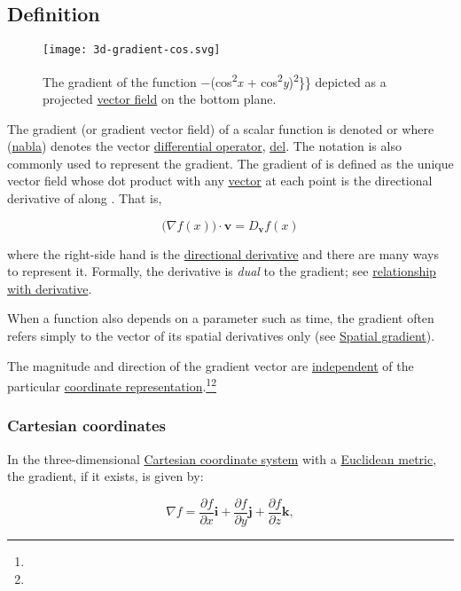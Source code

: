 \documentclass[
]{article}
\begin{document}
\hypertarget{definition}{%
\subsection{Definition}\label{definition}}

\begin{figure}
\centering
\texttt{[image: 3d-gradient-cos.svg]}
\caption{The gradient of the function −(cos\textsuperscript{2}\emph{x} +
cos\textsuperscript{2}\emph{y})\textsuperscript{2}\}\} depicted as a
projected \href{vector_field}{vector field} on the bottom plane.}
\end{figure}

The gradient (or gradient vector field) of a scalar function is denoted
or where (\href{nabla_symbol}{nabla}) denotes the vector
\href{differential_operator}{differential operator}, \url{del}. The
notation is also commonly used to represent the gradient. The gradient
of is defined as the unique vector field whose dot product with any
\href{Euclidean_vector}{vector} at each point is the directional
derivative of along . That is,

\[\big(\nabla f(x)\big)\cdot \mathbf{v} = D_{\mathbf v}f(x)\]

where the right-side hand is the
\href{directional_derivative}{directional derivative} and there are many
ways to represent it. Formally, the derivative is \emph{dual} to the
gradient; see \protect\hyperlink{Derivative}{relationship with
derivative}.

When a function also depends on a parameter such as time, the gradient
often refers simply to the vector of its spatial derivatives only (see
\href{Spatial_gradient}{Spatial gradient}).

The magnitude and direction of the gradient vector are
\href{Invariant_(mathematics)}{independent} of the particular
\href{Coordinate_system}{coordinate
representation}.\footnote{}\footnote{}

\hypertarget{cartesian_coordinates}{%
\subsubsection{Cartesian coordinates}\label{cartesian_coordinates}}

In the three-dimensional \href{Cartesian_coordinate_system}{Cartesian
coordinate system} with a \href{Euclidean_metric}{Euclidean metric}, the
gradient, if it exists, is given by:

\[\nabla f = \frac{\partial f}{\partial x} \mathbf{i} + \frac{\partial f}{\partial y} \mathbf{j} + \frac{\partial f}{\partial z} \mathbf{k},\]
\end{document}
